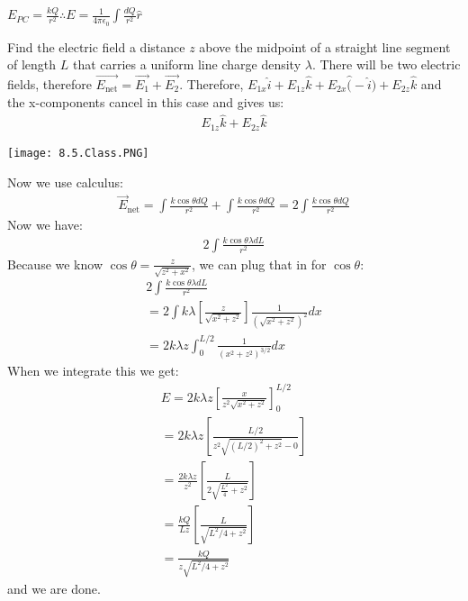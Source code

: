 \documentclass[../em.tex]{subfiles}
\begin{document}
$E_{PC}=\frac{kQ}{r^2} \therefore E=\frac{1}{4\pi\epsilon_0}\int \frac{dQ}{r^2}\hat{r}$

\begin{example}
    Find the electric field a distance $z$ above the midpoint of a straight line segment of length $L$ that carries a uniform line charge density $\lambda$.
    \smallbreak
    There will be two electric fields, therefore $\vec{E_{\text{net}}}=\vec{E_1}+\vec{E_2}$.
    \smallbreak
    Therefore, $E_{1x}\hat{i}+E_{1z}\hat{k}+E_{2x}\hat(-\hat{i})+E_{2z}\hat{k}$ and the x-components cancel in this case and gives us:
    \begin{align*}
        E_{1z}\hat{k}+E_{2z}\hat{k}
    \end{align*}
    \begin{center}
        \texttt{[image: 8.5.Class.PNG]}
    \end{center}
    Now we use calculus:
    \begin{align*}
    \vec{E}_{\text{net}}=\int{\frac{k\cos \theta dQ}{r^2}}+\int{\frac{k\cos\theta dQ}{r^2}}=2\int{\frac{k\cos\theta dQ}{r^2}}
    \end{align*}
    Now we have: 
    \begin{align*}
    2\int{\frac{k\cos\theta\lambda dL}{r^2}}
    \end{align*}
    Because we know $\cos\theta = \frac{z}{\sqrt{z^2+x^2}}$, we can plug that in for $\cos\theta$:
    \begin{align*}
        2\int{\frac{k\cos\theta\lambda dL}{r^2}}
        \\
        =2\int{k\lambda\left[\frac{z}{\sqrt{x^2+z^2}}\right]\frac{1}{(\sqrt{x^2+z^2})^2}dx}
        \\=2k\lambda z\int_0^{L/2}{\frac{1}{(x^2+z^2)^{3/2}}dx}
    \end{align*}
    When we integrate this we get:
    \begin{align*}
    E=2k\lambda z\left[\frac{x}{z^2\sqrt{x^2+z^2}}\right]^{L/2}_0
    \\
    =2k\lambda z\left[\frac{L/2}{z^2\sqrt{(L/2)^2+z^2}-0}\right]
    \\
    =\frac{2k\lambda z}{z^2}\left[\frac{L}{2\sqrt{\frac{L^2}{4}+z^2}}\right]
    \\
    =\frac{kQ}{Lz}\left[\frac{L}{\sqrt{L^2/4+z^2}}\right]
    \\
    =\frac{kQ}{z\sqrt{L^2/4+z^2}}
    \end{align*}
    and we are done.
\end{example}
\end{document}
